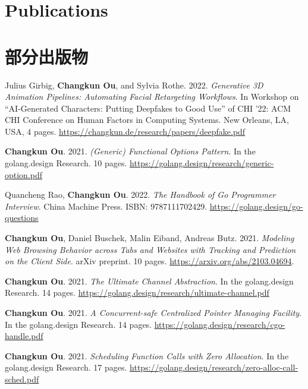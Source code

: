  {
    \section{\textbf{Publications}}
}{
    \section{\textbf{部分出版物}}
}
\resumeSubHeadingListStart
\small
    \item{
        Julius Girbig, \textbf{Changkun Ou}, and Sylvia Rothe. 2022.
        \emph{Generative 3D Animation Pipelines: Automating Facial Retargeting Workflows}.
        In Workshop on ``AI-Generated Characters: Putting Deepfakes to Good Use'' of CHI '22: ACM CHI Conference on Human Factors in Computing Systems. New Orleans, LA, USA, 4 pages.
        \url{https://changkun.de/research/papers/deepfake.pdf}
    }
    \item{
        \textbf{Changkun Ou}. 2021.
        \emph{(Generic) Functional Options Pattern}.
        In the golang.design Research. 10 pages.
        \url{https://golang.design/research/generic-option.pdf}
    }
    \item{
        Quancheng Rao, \textbf{Changkun Ou}. 2022.
        \emph{The Handbook of Go Programmer Interview}.
        China Machine Press. ISBN: 9787111702429.
        \url{https://golang.design/go-questions}
    }
    \item{
        \textbf{Changkun Ou}, Daniel Buschek, Malin Eiband, Andreas Butz. 2021.
        \emph{Modeling Web Browsing Behavior across Tabs and Websites with Tracking and Prediction on the Client Side}.
        arXiv preprint. 10 pages.
        \url{https://arxiv.org/abs/2103.04694}.
    }
    \item{
        \textbf{Changkun Ou}. 2021.
        \emph{The Ultimate Channel Abstraction}.
        In the golang.design Research. 14 pages.
        \url{https://golang.design/research/ultimate-channel.pdf}
    }
    \item{
        \textbf{Changkun Ou}. 2021.
        \emph{A Concurrent-safe Centralized Pointer Managing Facility}.
        In the golang.design Research. 14 pages.
        \url{https://golang.design/research/cgo-handle.pdf}
    }
    \item{
        \textbf{Changkun Ou}. 2021.
        \emph{Scheduling Function Calls with Zero Allocation}.
        In the golang.design Research. 17 pages.
        \url{https://golang.design/research/zero-alloc-call-sched.pdf}
    }
